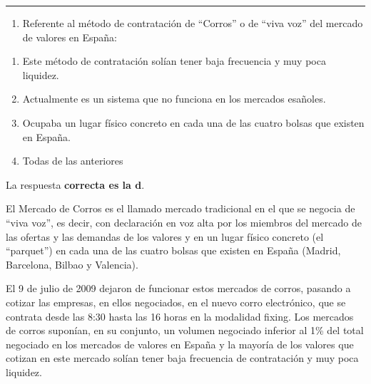 \documentclass[
  letterpaper,
  DIV=11,
  numbers=noendperiod]{scrreprt}
\providecommand{\tightlist}{%
  \setlength{\itemsep}{0pt}\setlength{\parskip}{0pt}}\usepackage{longtable,booktabs,array}
\begin{document}
\begin{center}\rule{0.5\linewidth}{0.5pt}\end{center}

\begin{enumerate}
\def\labelenumi{\arabic{enumi}.}
\setcounter{enumi}{4}
\tightlist
\item
  Referente al método de contratación de ``Corros'' o de ``viva voz''
  del mercado de valores en España:
\end{enumerate}

\begin{enumerate}
\def\labelenumi{\alph{enumi})}
\item
  Este método de contratación solían tener baja frecuencia y muy poca
  liquidez.
\item
  Actualmente es un sistema que no funciona en los mercados esañoles.
\item
  Ocupaba un lugar físico concreto en cada una de las cuatro bolsas que
  existen en España.
\item
  Todas de las anteriores
\end{enumerate}

\begin{tcolorbox}[enhanced jigsaw, left=2mm, opacityback=0, colback=white, breakable, arc=.35mm, bottomrule=.15mm, rightrule=.15mm, toprule=.15mm, leftrule=.75mm, colframe=quarto-callout-tip-color-frame]
\begin{minipage}[t]{5.5mm}
\textcolor{quarto-callout-tip-color}{\faLightbulb}
\end{minipage}%
\begin{minipage}[t]{\textwidth - 5.5mm}

La respuesta \textbf{correcta es la d}.

El Mercado de Corros es el llamado mercado tradicional en el que se
negocia de ``viva voz'', es decir, con declaración en voz alta por los
miembros del mercado de las ofertas y las demandas de los valores y en
un lugar físico concreto (el ``parquet'') en cada una de las cuatro
bolsas que existen en España (Madrid, Barcelona, Bilbao y Valencia).

El 9 de julio de 2009 dejaron de funcionar estos mercados de corros,
pasando a cotizar las empresas, en ellos negociados, en el nuevo corro
electrónico, que se contrata desde las 8:30 hasta las 16 horas en la
modalidad fixing. Los mercados de corros suponían, en su conjunto, un
volumen negociado inferior al 1\% del total negociado en los mercados de
valores en España y la mayoría de los valores que cotizan en este
mercado solían tener baja frecuencia de contratación y muy poca
liquidez.

\end{minipage}%
\end{tcolorbox}
\end{document}
